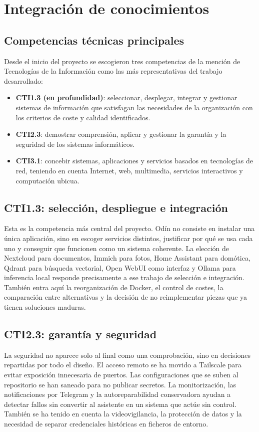 \chapter{Integración de conocimientos}

\section{Competencias técnicas principales}
Desde el inicio del proyecto se escogieron tres competencias de la mención de Tecnologías de la Información como las más representativas del trabajo desarrollado:
\begin{itemize}
  \item \textbf{CTI1.3 (en profundidad)}: seleccionar, desplegar, integrar y gestionar sistemas de información que satisfagan las necesidades de la organización con los criterios de coste y calidad identificados.
  \item \textbf{CTI2.3}: demostrar comprensión, aplicar y gestionar la garantía y la seguridad de los sistemas informáticos.
  \item \textbf{CTI3.1}: concebir sistemas, aplicaciones y servicios basados en tecnologías de red, teniendo en cuenta Internet, web, multimedia, servicios interactivos y computación ubicua.
\end{itemize}

\section{CTI1.3: selección, despliegue e integración}
Esta es la competencia más central del proyecto. Odín no consiste en instalar una única aplicación, sino en escoger servicios distintos, justificar por qué se usa cada uno y conseguir que funcionen como un sistema coherente. La elección de Nextcloud para documentos, Immich para fotos, Home Assistant para domótica, Qdrant para búsqueda vectorial, Open WebUI como interfaz y Ollama para inferencia local responde precisamente a ese trabajo de selección e integración. También entra aquí la reorganización de Docker, el control de costes, la comparación entre alternativas y la decisión de no reimplementar piezas que ya tienen soluciones maduras.

\section{CTI2.3: garantía y seguridad}
La seguridad no aparece solo al final como una comprobación, sino en decisiones repartidas por todo el diseño. El acceso remoto se ha movido a Tailscale para evitar exposición innecesaria de puertos. Las configuraciones que se suben al repositorio se han saneado para no publicar secretos. La monitorización, las notificaciones por Telegram y la autoreparabilidad conservadora ayudan a detectar fallos sin convertir al asistente en un sistema que actúe sin control. También se ha tenido en cuenta la videovigilancia, la protección de datos y la necesidad de separar credenciales históricas en ficheros de entorno.

